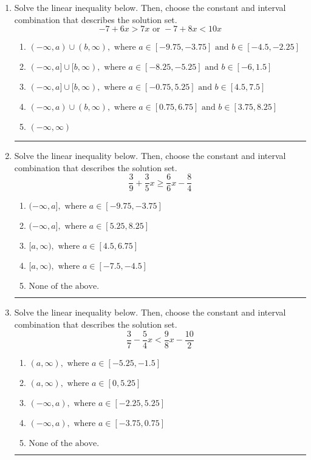 \documentclass[14pt]{extbook}
\newcommand{\litem}[1]{\item#1\hspace*{-1cm}\rule{\textwidth}{0.4pt}}
\begin{document}
\begin{enumerate}
\litem{
Solve the linear inequality below. Then, choose the constant and interval combination that describes the solution set.\[ -7 + 6 x > 7 x \text{ or } -7 + 8 x < 10 x \]\begin{enumerate}[label=\Alph*.]
\item \( (-\infty, a) \cup (b, \infty), \text{ where } a \in [-9.75, -3.75] \text{ and } b \in [-4.5, -2.25] \)
\item \( (-\infty, a] \cup [b, \infty), \text{ where } a \in [-8.25, -5.25] \text{ and } b \in [-6, 1.5] \)
\item \( (-\infty, a] \cup [b, \infty), \text{ where } a \in [-0.75, 5.25] \text{ and } b \in [4.5, 7.5] \)
\item \( (-\infty, a) \cup (b, \infty), \text{ where } a \in [0.75, 6.75] \text{ and } b \in [3.75, 8.25] \)
\item \( (-\infty, \infty) \)

\end{enumerate} }
\litem{
Solve the linear inequality below. Then, choose the constant and interval combination that describes the solution set.\[ \frac{3}{9} + \frac{3}{5} x \geq \frac{6}{6} x - \frac{8}{4} \]\begin{enumerate}[label=\Alph*.]
\item \( (-\infty, a], \text{ where } a \in [-9.75, -3.75] \)
\item \( (-\infty, a], \text{ where } a \in [5.25, 8.25] \)
\item \( [a, \infty), \text{ where } a \in [4.5, 6.75] \)
\item \( [a, \infty), \text{ where } a \in [-7.5, -4.5] \)
\item \( \text{None of the above}. \)

\end{enumerate} }
\litem{
Solve the linear inequality below. Then, choose the constant and interval combination that describes the solution set.\[ \frac{3}{7} - \frac{5}{4} x < \frac{9}{8} x - \frac{10}{2} \]\begin{enumerate}[label=\Alph*.]
\item \( (a, \infty), \text{ where } a \in [-5.25, -1.5] \)
\item \( (a, \infty), \text{ where } a \in [0, 5.25] \)
\item \( (-\infty, a), \text{ where } a \in [-2.25, 5.25] \)
\item \( (-\infty, a), \text{ where } a \in [-3.75, 0.75] \)
\item \( \text{None of the above}. \)


\end{enumerate}}
\end{enumerate}
\end{document}
